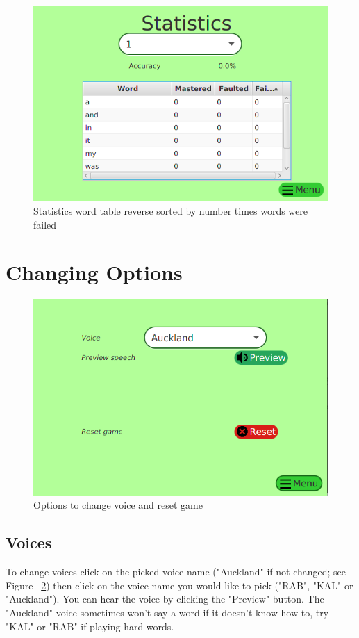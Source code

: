 \documentclass[12pt,a4paper,titlepage,onecolumn]{article}
\begin{document}
		\begin{figure}[h]
			\centering
			\includegraphics[width=1\linewidth]{Figures/Statistics/StatisticsFailedSorted2}
			\caption[Reverse Sorted by Failed]{Statistics word table reverse sorted by number times words were failed}
			\label{fig:StatisticsFailedSorted2}
		\end{figure}
		
	\section{Changing Options}
		\begin{figure}[h]
		\centering
		\includegraphics[width=1\linewidth]{Figures/Options/OptionsGeneral}
		\caption[Options Menu]{Options to change voice and reset game}
		\label{fig:OptionsGeneral}
		\end{figure}
		\subsection{Voices}
		To change voices click on the picked voice name ("Auckland" if not changed; see Figure ~\ref{fig:OptionsGeneral}) then click on the voice name you would like to pick ("RAB", "KAL" or "Auckland"). You can hear the voice by clicking the "Preview" button. The "Auckland" voice sometimes won't say a word if it doesn't know how to, try "KAL" or "RAB" if playing hard words.
\end{document}
